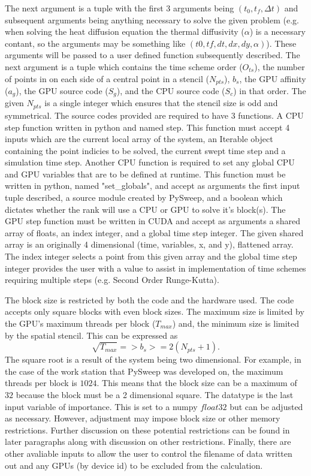 \documentclass[review]{elsarticle}
\begin{document}
\par
The next argument is a tuple with the first 3 arguments being $(t_0,t_f,\Delta t)$ and subsequent arguments being anything necessary to solve the given problem (e.g. when solving the heat diffusion equation the thermal diffusivity ($\alpha$) is a necessary contant, so the arguments may be something like $(t0,tf,dt, dx, dy, \alpha)$). These arguments will be passed to a user defined function subsequently described. The next argument is a tuple which contains the time scheme order ($O_{ts}$), the number of points in on each side of a central point in a stencil ($N_{pts}$), $b_s$, the GPU affinity ($a_g$), the GPU source code ($S_g$), and the CPU source code ($S_c$) in that order. The given $N_{pts}$ is a single integer which ensures that the stencil size is odd and symmetrical. The source codes provided are required to have 3 functions. A CPU step function written in python and named step. This function must accept 4 inputs which are the current local array of the system, an Iterable object containing the point indicies to be solved, the current swept time step and a simulation time step. Another CPU function is required to set any global CPU and GPU variables that are to be defined at runtime. This function must be written in python, named "set\_globals", and accept as arguments the first input tuple described, a source module created by PySweep, and a boolean which dictates whether the rank will use a CPU or GPU to solve it's block(s). The GPU step function must be written in CUDA and accept as arguments a shared array of floats, an index integer, and a global time step integer. The given shared array is an originally 4 dimensional (time, variables, x, and y), flattened array. The index integer selects a point from this given array and the global time step integer provides the user with a value to assist in implementation of time schemes requiring multiple steps (e.g. Second Order Runge-Kutta).

\par
The block size is restricted by both the code and the hardware used. The code accepts only square blocks with even block sizes. The maximum size is limited by the GPU's maximum threads per block ($T_{max}$) and, the minimum size is limited by the spatial stencil. This can be expressed as
\begin{equation}
\sqrt{T_{max}} =>  b_s >= 2(N_{pts}+1).
\end{equation}
The square root is a result of the system being two dimensional. For example, in the case of the work station that PySweep was developed on, the maximum threads per block is $1024$. This means that the block size can be a maximum of $32$ because the block must be a 2 dimensional square. The datatype is the last input variable of importance. This is set to a numpy $float32$ but can be adjusted as necessary. However, adjustment may impose block size or other memory restrictions. Further discussion on these potential restrictions can be found in later paragraphs along with discussion on other restrictions. Finally, there are other avaliable inputs to allow the user to control the filename of data written out and any GPUs (by device id) to be excluded from the calculation.
\end{document}

